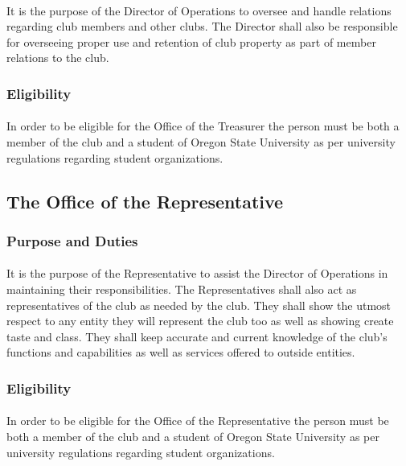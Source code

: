 \documentclass[12pt]{article}
\begin{document}
\paragraph{}
It is the purpose of the Director of Operations to oversee and handle relations regarding club members and other clubs. The Director shall also be responsible for overseeing proper use and retention of club property as 
part of member relations to the club. 
\subsubsection{Eligibility}
\paragraph{}
In order to be eligible for the Office of the Treasurer the person must be both a member of the club and a student of Oregon State University as per university regulations regarding student organizations.

\subsection{The Office of the Representative}
\subsubsection{Purpose and Duties}
\paragraph{}
It is the purpose of the Representative to assist the Director of Operations in maintaining their responsibilities. The Representatives shall also act as representatives of the club as needed by the club. They shall show
the utmost respect to any entity they will represent the club too as well as showing create taste and class. They shall keep accurate and current knowledge of the club's functions and capabilities as well
as services offered to outside entities.
\subsubsection{Eligibility}
\paragraph{}
In order to be eligible for the Office of the Representative the person must be both a member of the club and a student of Oregon State University as per university regulations regarding student organizations.
\end{document}
